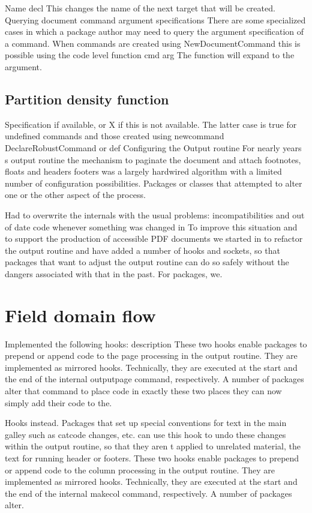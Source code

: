 \documentclass{article}
\begin{document}
Name decl This changes the name of the next target that will be created. Querying document command argument specifications There are some specialized cases in which a package author may need to query the argument specification of a command. When commands are created using NewDocumentCommand this is possible using the code level function cmd arg The function will expand to the argument.

\subsection{Partition density function}
Specification if available, or X if this is not available. The latter case is true for undefined commands and those created using newcommand DeclareRobustCommand or def Configuring the Output routine For nearly years s output routine the mechanism to paginate the document and attach footnotes, floats and headers footers was a largely hardwired algorithm with a limited number of configuration possibilities. Packages or classes that attempted to alter one or the other aspect of the process.

Had to overwrite the internals with the usual problems: incompatibilities and out of date code whenever something was changed in To improve this situation and to support the production of accessible PDF documents we started in to refactor the output routine and have added a number of hooks and sockets, so that packages that want to adjust the output routine can do so safely without the dangers associated with that in the past. For packages, we.

\section{Field domain flow}\label{sec7}
Implemented the following hooks: description These two hooks enable packages to prepend or append code to the page processing in the output routine. They are implemented as mirrored hooks. Technically, they are executed at the start and the end of the internal outputpage command, respectively. A number of packages alter that command to place code in exactly these two places they can now simply add their code to the.

Hooks instead. Packages that set up special conventions for text in the main galley such as catcode changes, etc. can use this hook to undo these changes within the output routine, so that they aren t applied to unrelated material, the text for running header or footers. These two hooks enable packages to prepend or append code to the column processing in the output routine. They are implemented as mirrored hooks. Technically, they are executed at the start and the end of the internal makecol command, respectively. A number of packages alter.
\end{document}
